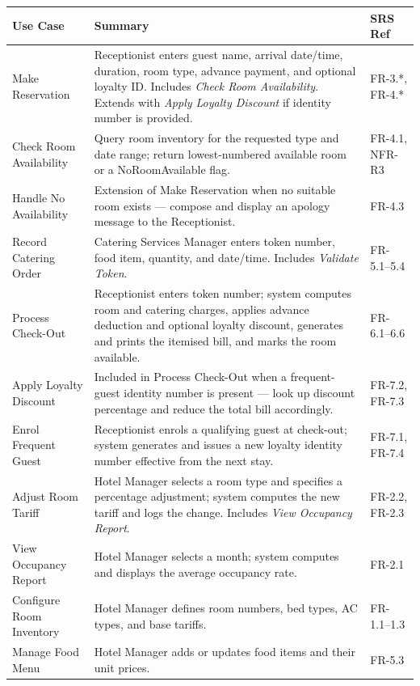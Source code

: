 \documentclass[12pt,a4paper]{article}
\renewcommand{\thead}[1]{%
  \cellcolor{tableheadbg}\color{white}\textbf{#1}%
}
\begin{document}
\begin{longtable}{|L{3.5cm}|L{9cm}|L{2.2cm}|}
  \hline
  \thead{Use Case} & \thead{Summary} & \thead{SRS Ref} \\
  \hline
  \endhead
  \hline
  \endfoot
  Make Reservation
    & Receptionist enters guest name, arrival date/time, duration, room type, advance
      payment, and optional loyalty ID. Includes \emph{Check Room Availability}.
      Extends with \emph{Apply Loyalty Discount} if identity number is provided.
    & FR-3.*, FR-4.* \\
  \hline
  Check Room Availability
    & Query room inventory for the requested type and date range; return lowest-numbered
      available room or a NoRoomAvailable flag.
    & FR-4.1, NFR-R3 \\
  \hline
  Handle No Availability
    & Extension of Make Reservation when no suitable room exists --- compose and
      display an apology message to the Receptionist.
    & FR-4.3 \\
  \hline
  Record Catering Order
    & Catering Services Manager enters token number, food item, quantity, and
      date/time. Includes \emph{Validate Token}.
    & FR-5.1--5.4 \\
  \hline
  Process Check-Out
    & Receptionist enters token number; system computes room and catering charges,
      applies advance deduction and optional loyalty discount, generates and prints
      the itemised bill, and marks the room available.
    & FR-6.1--6.6 \\
  \hline
  Apply Loyalty Discount
    & Included in Process Check-Out when a frequent-guest identity number is present
      --- look up discount percentage and reduce the total bill accordingly.
    & FR-7.2, FR-7.3 \\
  \hline
  Enrol Frequent Guest
    & Receptionist enrols a qualifying guest at check-out; system generates and
      issues a new loyalty identity number effective from the next stay.
    & FR-7.1, FR-7.4 \\
  \hline
  Adjust Room Tariff
    & Hotel Manager selects a room type and specifies a percentage adjustment;
      system computes the new tariff and logs the change. Includes
      \emph{View Occupancy Report}.
    & FR-2.2, FR-2.3 \\
  \hline
  View Occupancy Report
    & Hotel Manager selects a month; system computes and displays the average
      occupancy rate.
    & FR-2.1 \\
  \hline
  Configure Room Inventory
    & Hotel Manager defines room numbers, bed types, AC types, and base tariffs.
    & FR-1.1--1.3 \\
  \hline
  Manage Food Menu
    & Hotel Manager adds or updates food items and their unit prices.
    & FR-5.3 \\
  \hline
\end{longtable}
\end{document}
